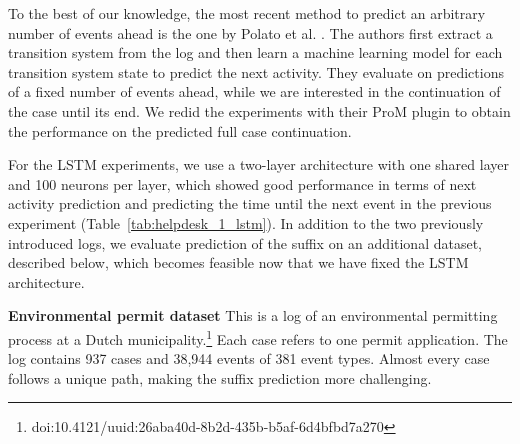 \documentclass[runningheads,a4paper]{llncs}
\begin{document}
To the best of our knowledge, the most recent method to predict an arbitrary number of events ahead is the one by Polato et al. \cite{Polato2016}. The authors first extract a transition system from the log and then learn a machine learning model for each transition system state to predict the next activity. They evaluate on predictions of a fixed number of events ahead, while we are interested in the continuation of the case until its end. We redid the experiments with their ProM plugin to obtain the performance on the predicted full case continuation.

For the LSTM experiments, we use a two-layer architecture with one shared layer and 100 neurons per layer, which showed good performance in terms of next activity prediction and predicting the time until the next event in the previous experiment (Table~\ref{tab:helpdesk_1_lstm}). In addition to the two previously introduced logs, we evaluate prediction of the suffix on an additional dataset, described below, which becomes feasible now that we have fixed the LSTM architecture. 

\medskip\noindent\textbf{Environmental permit dataset}
This is a log of an environmental permitting process at a Dutch municipality.\footnote{doi:10.4121/uuid:26aba40d-8b2d-435b-b5af-6d4bfbd7a270} Each case refers to one permit application. The log contains 937 cases and 38,944 events of 381 event types. Almost every case follows a unique path, making the suffix prediction more challenging.
\end{document}
